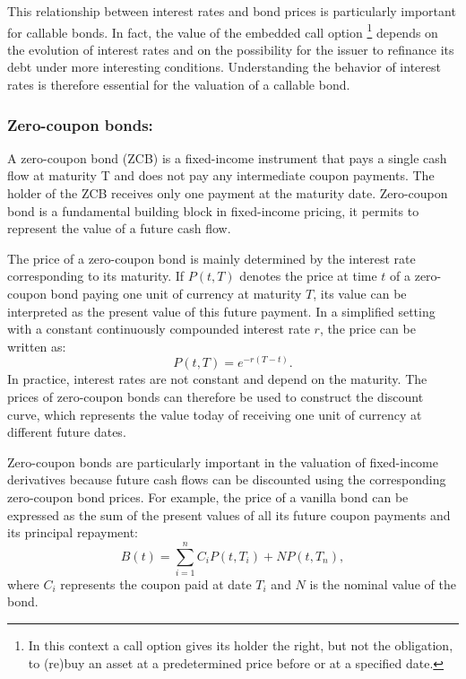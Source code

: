 \documentclass{article}
\begin{document}
This relationship between interest rates and bond prices is particularly important for callable bonds. In fact, the value of the embedded call option \footnote{ In this context a call option gives its holder the right, but not the obligation, to (re)buy an asset at a predetermined price before or at a specified date.} depends on the evolution of interest rates and on the possibility for the issuer to refinance its debt under more interesting conditions. Understanding the behavior of interest rates is therefore essential for the valuation of a callable bond.
\\

\subsubsection{Zero-coupon bonds:}

A zero-coupon bond (ZCB) is a fixed-income instrument that pays a single cash flow at maturity T and does not pay any intermediate coupon payments. The holder of the ZCB receives only one payment at the maturity date. Zero-coupon bond is a fundamental building block in fixed-income pricing, it permits to represent the value of a future cash flow.

The price of a zero-coupon bond is mainly determined by the interest rate corresponding to its maturity. If $P(t,T)$ denotes the price at time $t$ of a zero-coupon bond paying one unit of currency at maturity $T$, its value can be interpreted as the present value of this future payment. In a simplified setting with a constant continuously compounded interest rate $r$, the price can be written as:
\begin{equation}
    P(t,T) = e^{-r(T-t)}.
\end{equation}
In practice, interest rates are not constant and depend on the maturity. The prices of zero-coupon bonds can therefore be used to construct the discount curve, which represents the value today of receiving one unit of currency at different future dates.

Zero-coupon bonds are particularly important in the valuation of fixed-income derivatives because future cash flows can be discounted using the corresponding zero-coupon bond prices. For example, the price of a vanilla bond can be expressed as the sum of the present values of all its future coupon payments and its principal repayment:
\begin{equation}
    B(t) = \sum_{i=1}^{n} C_i P(t,T_i) + N P(t,T_n),
\end{equation}
where $C_i$ represents the coupon paid at date $T_i$ and $N$ is the nominal value of the bond.
\end{document}
